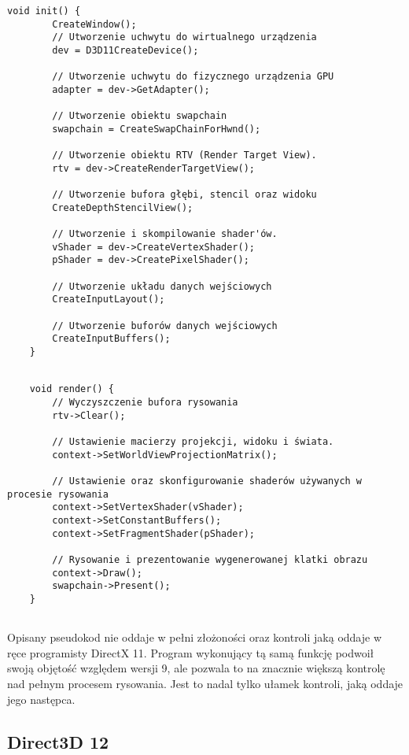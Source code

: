 \begin{lstlisting}[caption={Pseudokod inicjalizacji Direct3D 11 (oryginalna treść)}, label={lst:d3d11:init}]
	void init() {
		CreateWindow();	
		// Utworzenie uchwytu do wirtualnego urządzenia
		dev = D3D11CreateDevice();		
		
		// Utworzenie uchwytu do fizycznego urządzenia GPU
		adapter = dev->GetAdapter();	
		
		// Utworzenie obiektu swapchain
		swapchain = CreateSwapChainForHwnd();	
		
		// Utworzenie obiektu RTV (Render Target View).
		rtv = dev->CreateRenderTargetView();	
		
		// Utworzenie bufora głębi, stencil oraz widoku
		CreateDepthStencilView();	
		
		// Utworzenie i skompilowanie shader'ów.
		vShader = dev->CreateVertexShader();
		pShader = dev->CreatePixelShader();	
		
		// Utworzenie układu danych wejściowych
		CreateInputLayout();	
		
		// Utworzenie buforów danych wejściowych
		CreateInputBuffers();
	}	
\end{lstlisting}

\vfill

\begin{lstlisting}[caption={Pseudokod rysowania Direct3D 11 (oryginalna treść)}, label={lst:d3d11:render}]
	
	void render() {
		// Wyczyszczenie bufora rysowania
		rtv->Clear();
		
		// Ustawienie macierzy projekcji, widoku i świata.
		context->SetWorldViewProjectionMatrix();
		
		// Ustawienie oraz skonfigurowanie shaderów używanych w procesie rysowania
		context->SetVertexShader(vShader);	
		context->SetConstantBuffers();
		context->SetFragmentShader(pShader);
		
		// Rysowanie i prezentowanie wygenerowanej klatki obrazu
		context->Draw();
		swapchain->Present();
	}
	
\end{lstlisting}

Opisany pseudokod nie oddaje w pełni złożoności oraz kontroli jaką
oddaje w ręce programisty DirectX 11. Program wykonujący tą samą funkcję
podwoił swoją objętość względem wersji 9, ale pozwala to na znacznie
większą kontrolę nad pełnym procesem rysowania. Jest to nadal tylko
ułamek kontroli, jaką oddaje jego następca.

\subsection{Direct3D 12}

